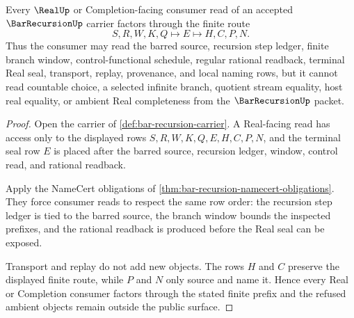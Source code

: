 \begin{theorem}
\label{thm:bar-recursion-real-completion-nonescape}
Every $\RealUp$ or Completion-facing consumer read of an accepted $\BarRecursionUp$ carrier factors through the finite route
$$
S,R,W,K,Q \longmapsto E \longmapsto H,C,P,N .
$$
Thus the consumer may read the barred source, recursion step ledger, finite branch window, control-functional schedule, regular rational readback, terminal Real seal, transport, replay, provenance, and local naming rows, but it cannot read countable choice, a selected infinite branch, quotient stream equality, host real equality, or ambient Real completeness from the $\BarRecursionUp$ packet.
\end{theorem}
\begin{proof}
Open the carrier of \autoref{def:bar-recursion-carrier}. A Real-facing read has access only to the displayed rows $S,R,W,K,Q,E,H,C,P,N$, and the terminal seal row $E$ is placed after the barred source, recursion ledger, window, control read, and rational readback.

Apply the NameCert obligations of \autoref{thm:bar-recursion-namecert-obligations}. They force consumer reads to respect the same row order: the recursion step ledger is tied to the barred source, the branch window bounds the inspected prefixes, and the rational readback is produced before the Real seal can be exposed.

Transport and replay do not add new objects. The rows $H$ and $C$ preserve the displayed finite route, while $P$ and $N$ only source and name it. Hence every Real or Completion consumer factors through the stated finite prefix and the refused ambient objects remain outside the public surface.
\end{proof}


\begin{closurestatus}{\BarRecursionUp}
  \theoryclosure{\seedClosure}
  \formalstatus{\unformalizedV}
\end{closurestatus}
